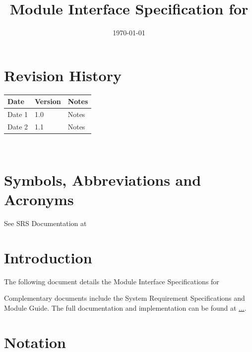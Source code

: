 \documentclass[12pt, titlepage]{article}
\begin{document}
\title{Module Interface Specification for \progname{}}

\author{\authname}

\date{\today}

\maketitle


\section{Revision History}

\begin{tabularx}{\textwidth}{p{3cm}p{2cm}X}
\toprule {\bf Date} & {\bf Version} & {\bf Notes}\\
\midrule
Date 1 & 1.0 & Notes\\
Date 2 & 1.1 & Notes\\
\bottomrule
\end{tabularx}

~\newpage

\section{Symbols, Abbreviations and Acronyms}

See SRS Documentation at 


\newpage

\tableofcontents

\newpage


\section{Introduction}

The following document details the Module Interface Specifications for

Complementary documents include the System Requirement Specifications
and Module Guide.  The full documentation and implementation can be
found at \url{...}.  

\section{Notation}
\end{document}
